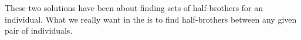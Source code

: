 {These two solutions have been about finding sets of half-brothers for an individual. What we really want in the \fhkb is to find half-brothers between any given pair of individuals.



}

